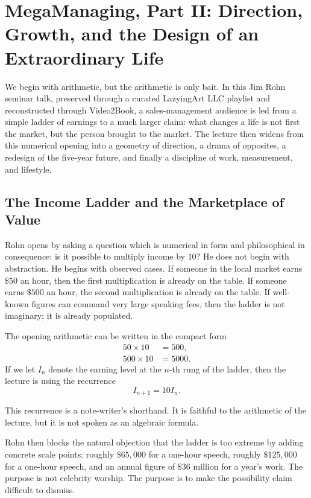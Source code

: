 \chapter{MegaManaging, Part II: Direction, Growth, and the Design of an Extraordinary Life}

We begin with arithmetic, but the arithmetic is only bait. In this Jim Rohn seminar talk, preserved through a curated LazyingArt LLC playlist and reconstructed through Video2Book, a sales-management audience is led from a simple ladder of earnings to a much larger claim: what changes a life is not first the market, but the person brought to the market. The lecture then widens from this numerical opening into a geometry of direction, a drama of opposites, a redesign of the five-year future, and finally a discipline of work, measurement, and lifestyle.

\section{The Income Ladder and the Marketplace of Value}

Rohn opens by asking a question which is numerical in form and philosophical in consequence: is it possible to multiply income by \(10\)? He does not begin with abstraction. He begins with observed cases. If someone in the local market earns \(\$50\) an hour, then the first multiplication is already on the table. If someone earns \(\$500\) an hour, the second multiplication is already on the table. If well-known figures can command very large speaking fees, then the ladder is not imaginary; it is already populated.

The opening arithmetic can be written in the compact form
\begin{align}
50 \times 10 &= 500,\\
500 \times 10 &= 5000.
\end{align}
If we let \(I_n\) denote the earning level at the \(n\)-th rung of the ladder, then the lecture is using the recurrence
\begin{equation}
I_{n+1}=10I_n.
\end{equation}

\begin{remark}
This recurrence is a note-writer's shorthand. It is faithful to the arithmetic of the lecture, but it is not spoken as an algebraic formula.
\end{remark}

Rohn then blocks the natural objection that the ladder is too extreme by adding concrete scale points: roughly \(\$65{,}000\) for a one-hour speech, roughly \(\$125{,}000\) for a one-hour speech, and an annual figure of \(\$36\) million for a year's work. The purpose is not celebrity worship. The purpose is to make the possibility claim difficult to dismiss.

